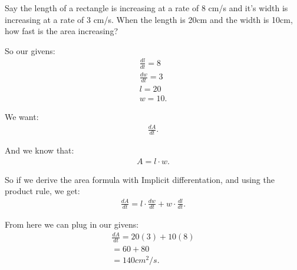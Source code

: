 \documentclass{report}
\begin{document}
    \bigbreak \noindent \bigbreak \noindent
    Say the length of a rectangle is increasing at a rate of 8 cm/s and it’s width is increasing at a rate
of 3 cm/s. When the length is 20cm and the width is 10cm, how fast is the area increasing?

    \bigbreak \noindent \bigbreak \noindent
    So our givens:
    \begin{align*}
      \frac{dl}{dt} = 8 \\
      \frac{dw}{dt} = 3 \\
      l = 20 \\
      w =10
    .\end{align*}

    \bigbreak \noindent 
    We want:
    \begin{align*}
      \frac{dA}{dt}
    .\end{align*}

    \bigbreak \noindent \bigbreak \noindent
    And we know that:
    \begin{align*}
      A = l \cdot w
    .\end{align*}

    \bigbreak \noindent 
    So if we derive the area formula with Implicit differentation, and using the product rule, we get:
    \begin{align*}
      \frac{dA}{dt} = l \cdot \frac{dw}{dt} + w \cdot \frac{dl}{dt}
    .\end{align*}

    \bigbreak \noindent 
    From here we can plug in our givens:
    \begin{align*}
      \frac{dA}{dt} = 20(3) + 10(8) \\
      = 60 +80 \\
      = 140cm^{2}/s
    .\end{align*}

    \pagebreak \bigbreak \noindent
\end{document}
